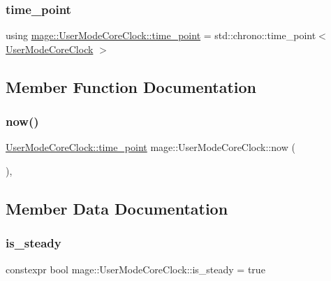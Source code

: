 \hypertarget{structmage_1_1_user_mode_core_clock_a765f0c91417367ed676ffcde829ab365}{}\label{structmage_1_1_user_mode_core_clock_a765f0c91417367ed676ffcde829ab365} 
\subsubsection{\texorpdfstring{time\+\_\+point}{time\_point}}
{\footnotesize\ttfamily using \hyperlink{structmage_1_1_user_mode_core_clock_a765f0c91417367ed676ffcde829ab365}{mage\+::\+User\+Mode\+Core\+Clock\+::time\+\_\+point} =  std\+::chrono\+::time\+\_\+point$<$ \hyperlink{structmage_1_1_user_mode_core_clock}{User\+Mode\+Core\+Clock} $>$}



\subsection{Member Function Documentation}
\hypertarget{structmage_1_1_user_mode_core_clock_a79614771eb0eb46a43283c87a18f339b}{}\label{structmage_1_1_user_mode_core_clock_a79614771eb0eb46a43283c87a18f339b} 
\subsubsection{\texorpdfstring{now()}{now()}}
{\footnotesize\ttfamily \hyperlink{structmage_1_1_user_mode_core_clock_a765f0c91417367ed676ffcde829ab365}{User\+Mode\+Core\+Clock\+::time\+\_\+point} mage\+::\+User\+Mode\+Core\+Clock\+::now (\begin{DoxyParamCaption}{ }\end{DoxyParamCaption})\hspace{0.3cm}{\ttfamily [static]}, {\ttfamily [noexcept]}}



\subsection{Member Data Documentation}
\hypertarget{structmage_1_1_user_mode_core_clock_a041a1090219a8b03a5ac35ff251ef05a}{}\label{structmage_1_1_user_mode_core_clock_a041a1090219a8b03a5ac35ff251ef05a} 
\subsubsection{\texorpdfstring{is\+\_\+steady}{is\_steady}}
{\footnotesize\ttfamily constexpr bool mage\+::\+User\+Mode\+Core\+Clock\+::is\+\_\+steady = true\hspace{0.3cm}{\ttfamily [static]}}

